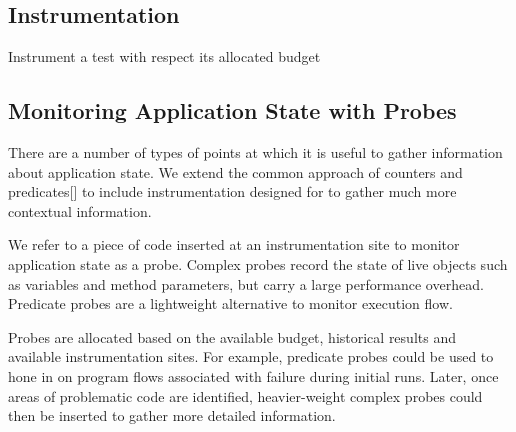 \subsection{Instrumentation}


\begin{algorithm}[H]
\caption{Instrument a test with respect its allocated budget}
\label{alg:instrument}
\begin{algorithmic}
			\Else
			\EndIf
		\EndFor
	\EndWhile
\end{algorithmic}
\end{algorithm}


\subsection{Monitoring Application State with Probes}

There are a number of types of points at which it is useful to gather information about application state. We extend the common approach of counters and predicates[] to include instrumentation designed for to gather much more contextual information.

We refer to a piece of code inserted at an instrumentation site to monitor application state as a probe. Complex probes record the state of live objects such as variables and method parameters, but carry a large performance overhead. Predicate probes are a lightweight alternative to monitor execution flow.

Probes are allocated based on the available budget, historical results and available instrumentation sites. For example, predicate probes could be used to hone in on program flows associated with failure during initial runs. Later, once areas of problematic code are identified, heavier-weight complex probes could then be inserted to gather more detailed information.


